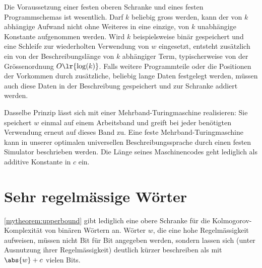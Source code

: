 \begin{myremark}
	Die Voraussetzung einer festen oberen Schranke und eines festen Programmschemas ist wesentlich. Darf $k$ beliebig gross werden, kann der von $k$ abhängige Aufwand nicht ohne Weiteres in eine einzige, von $k$ unabhängige Konstante aufgenommen werden. Wird $k$ beispielsweise binär gespeichert und eine Schleife zur wiederholten Verwendung von $w$ eingesetzt, entsteht zusätzlich ein von der Beschreibungslänge von $k$ abhängiger Term, typischerweise von der Grössenordnung $O\lr{\log (k)}$. Falls weitere Programmteile oder die Positionen der Vorkommen durch zusätzliche, beliebig lange Daten festgelegt werden, müssen auch diese Daten in der Beschreibung gespeichert und zur Schranke addiert werden.

	Dasselbe Prinzip lässt sich mit einer Mehrband-Turingmaschine realisieren: Sie speichert $w$ einmal auf einem Arbeitsband und greift bei jeder benötigten Verwendung erneut auf dieses Band zu. Eine feste Mehrband-Turingmaschine kann in unserer optimalen universellen Beschreibungssprache durch einen festen Simulator beschrieben werden. Die Länge seines Maschinencodes geht lediglich als additive Konstante in $c$ ein.
\end{myremark}

\clearpage
\section{Sehr regelmässige Wörter}
\cref{mytheorem:upperbound} gibt lediglich eine obere Schranke für die Kolmogorov-Komplexität von binären Wörtern an. Wörter $w$, die eine hohe Regelmässigkeit aufweisen, müssen nicht Bit für Bit angegeben werden, sondern lassen sich (unter Ausnutzung ihrer Regelmässigkeit) deutlich kürzer beschreiben als mit $\abs{w} + c$ vielen Bits.

